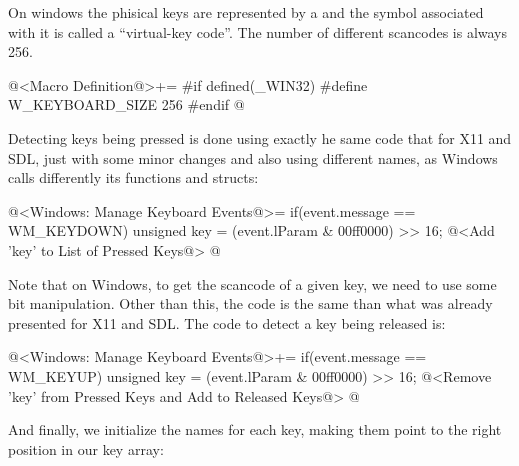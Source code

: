 
On windows the phisical keys are represented by
a  and the symbol associated with it is called a
``virtual-key code''. The number of different scancodes is always 256.

\iniciocodigo
@<Macro Definition@>+=
#if defined(_WIN32)
#define W_KEYBOARD_SIZE 256
#endif
@
\fimcodigo

Detecting keys being pressed is done using exactly he same code that
for X11 and SDL, just with some minor changes and also using different
names, as Windows calls differently its functions and structs:

\iniciocodigo
@<Windows: Manage Keyboard Events@>=
if(event.message == WM_KEYDOWN){
  unsigned key = (event.lParam & 00ff0000) >> 16;
  @<Add 'key' to List of Pressed Keys@>
}
@
\fimcodigo

Note that on Windows, to get the scancode of a given key, we need to
use some bit manipulation. Other than this, the code is the same than
what was already presented for X11 and SDL. The code to detect a key
being released is:

\iniciocodigo
@<Windows: Manage Keyboard Events@>+=
if(event.message == WM_KEYUP){
  unsigned key = (event.lParam & 00ff0000) >> 16;
  @<Remove 'key' from Pressed Keys and Add to Released Keys@>
}
@
\fimcodigo

And finally, we initialize the names for each key, making them point
to the right position in our key array:

